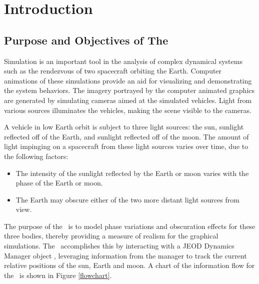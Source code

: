 \setcounter{chapter}{0}

\chapter{Introduction}\label{ch:intro}


\section{Purpose and Objectives of The \earthlightingDesc}

Simulation is an important tool in the analysis of complex dynamical
systems such as the rendezvous of two spacecraft orbiting the Earth.
Computer animations of these simulations
provide an aid for visualizing and demonstrating the system behaviors.
The imagery portrayed by the computer animated graphics are generated by
simulating cameras aimed at the simulated vehicles. Light from various sources
illuminates the vehicles, making the scene visible to the cameras.

A vehicle in low Earth orbit is subject to three light sources: the sun,
sunlight reflected off of the Earth, and sunlight reflected off of the moon.
The amount of light impinging on a spacecraft from these light sources
varies over time, due to the following factors:

\begin{itemize}
\item The intensity of the sunlight reflected by the Earth or moon
varies with the phase of the Earth or moon.
\item The Earth may obscure either of the two more distant light sources
from view.
\end{itemize}
The purpose of the \earthlightingDesc\ is to model phase variations and
obscuration effects for these three bodies,
thereby providing a measure of realism for the
graphical simulations. The \earthlightingDesc\ accomplishes this by interacting
with a JEOD Dynamics Manager object \cite{dynenv:DYNMANAGER} ,
leveraging information
from the manager to track the current relative
positions of the sun, Earth and moon. A chart of the information flow for
the \earthlightingDesc\ is shown in Figure \ref{flowchart}.

